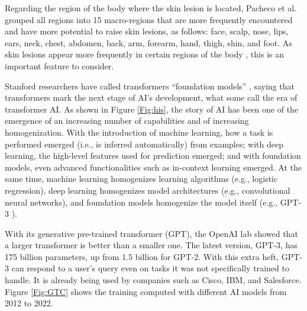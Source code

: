Regarding the region of the body where the skin lesion is located, Pacheco et al.\cite{pacheco2020impact} grouped all regions into 15 macro-regions that are more frequently encountered and have more potential to raise skin lesions, as follows: face, scalp, nose, lips, ears, neck, chest, abdomen, back, arm, forearm, hand, thigh, shin, and foot. As skin lesions appear more frequently in certain regions of the body \cite{wolff2009fitzpatrick}, this is an important feature to consider.



Stanford researchers have called transformers “foundation models” \cite{bommasani2021opportunities}, saying that transformers mark the next stage of AI’s development, what some call the era of transformer AI. As shown in Figure \ref{Fig:his}, the story of AI has been one of the emergence of an increasing number of capabilities and of increasing homogenization. With the introduction of machine learning, how a task is performed emerged (i.e., is inferred automatically) from examples; with deep learning, the high-level features used for prediction emerged; and with foundation models, even advanced functionalities such as in-context learning emerged. At the same time, machine learning homogenizes learning
algorithms (e.g., logistic regression), deep learning homogenizes model architectures (e.g., convolutional neural networks), and foundation models homogenize the model itself (e.g., GPT-3 \cite{brown2020language}).

With its generative pre-trained transformer (GPT), the OpenAI lab \cite{brown2020language} showed that a larger transformer is better than a smaller one. The latest version, GPT-3, has 175 billion parameters, up from 1.5 billion for GPT-2. With this extra heft, GPT-3 can respond to a user’s query even on tasks it was not specifically trained to handle. It is already being used by companies  such as Cisco, IBM, and Salesforce. Figure \ref{Fig:GTC} shows the training computed with different AI models from 2012 to 2022.

